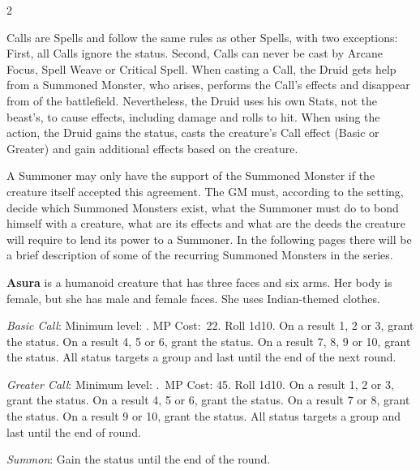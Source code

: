 \begin{multicols}{2}
	
    Calls are Spells and follow the same rules as other Spells, with two exceptions: First, all Calls ignore the  status. Second, Calls can never be cast by Arcane Focus, Spell Weave or Critical Spell. When casting a Call, the Druid gets help from a Summoned Monster, who arises, performs the Call’s effects and disappear from of the battlefield. Nevertheless, the Druid uses his own Stats, not the beast’s, to cause effects, including damage and rolls to hit. When using the  action, the Druid gains the  status, casts the creature’s Call effect (Basic or Greater) and gain additional effects based on the creature.

    A Summoner may only have the support of the Summoned Monster if the creature itself accepted this agreement. The GM must, according to the setting, decide which Summoned Monsters exist, what the Summoner must do to bond himself with a creature, what are its effects and what are the deeds the creature will require to lend its power to a Summoner. In the following pages there will be a brief description of some of the recurring Summoned Monsters in the series.

    \ffcrystal[type=level,height=8pt]
    
    \textbf{Asura} is a humanoid creature that has three faces and six arms. Her body is female, but she has male and female faces. She uses Indian-themed clothes.
    
	\textit{Basic Call}: Minimum level: . MP Cost:\ 22. Roll 1d10. On a result 1, 2 or 3, grant the  status. On a result 4, 5 or 6, grant the  status. On a result 7, 8, 9 or 10, grant the  status. All status targets a group and last until the end of the next round.
    
    \textit{Greater Call}: Minimum level: .\ MP Cost: 45. Roll 1d10. On a result 1, 2 or 3, grant the  status. On a result 4, 5 or 6, grant the  status. On a result 7 or 8, grant the  status. On a result 9 or 10, grant the  status. All status targets a group and last until the end of round.
    
    \textit{Summon}: Gain the  status until the end of the round.


\end{multicols}
